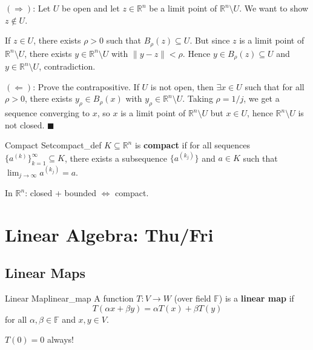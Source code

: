 \documentclass[11pt, letterpaper, openany]{book}
\renewenvironment{proof}[1][\proofname]{%
  \tcolorbox[blanker, breakable, left=1em,
    before skip=1em, after skip=1em,
    borderline west={2pt}{0pt}{MagicTeal!50},
    colback=MagicCream,
    before upper={\textcolor{MagicTeal}{\sffamily\bfseries #1.}\space}
  ]%
}{%
  \hfill\textcolor{MagicTeal}{\ensuremath{\blacksquare}}\endtcolorbox%
}
\begin{document}
\begin{proof}
$(\Rightarrow)$: Let $U$ be open and let $z \in \mathbb{R}^n$ be a limit point of $\mathbb{R}^n \setminus U$. We want to show $z \notin U$.

If $z \in U$, there exists $\rho > 0$ such that $B_\rho(z) \subseteq U$. But since $z$ is a limit point of $\mathbb{R}^n \setminus U$, there exists $y \in \mathbb{R}^n \setminus U$ with $\|y - z\| < \rho$. Hence $y \in B_\rho(z) \subseteq U$ and $y \in \mathbb{R}^n \setminus U$, contradiction.

$(\Leftarrow)$: Prove the contrapositive. If $U$ is not open, then $\exists x \in U$ such that for all $\rho > 0$, there exists $y_\rho \in B_\rho(x)$ with $y_\rho \in \mathbb{R}^n \setminus U$. Taking $\rho = 1/j$, we get a sequence converging to $x$, so $x$ is a limit point of $\mathbb{R}^n \setminus U$ but $x \in U$, hence $\mathbb{R}^n \setminus U$ is not closed.
\end{proof}

\begin{defn}{Compact Set}{compact_def}
$K \subseteq \mathbb{R}^n$ is \textbf{compact} if for all sequences $\{a^{(k)}\}_{k=1}^\infty \subseteq K$, there exists a subsequence $\{a^{(k_j)}\}$ and $a \in K$ such that $\lim_{j\to\infty} a^{(k_j)} = a$.
\end{defn}

\begin{remark}
In $\mathbb{R}^n$: closed + bounded $\Leftrightarrow$ compact.
\end{remark}

\section{Linear Algebra: Thu/Fri}

\subsection{Linear Maps}

\begin{defn}{Linear Map}{linear_map}
A function $T: V \to W$ (over field $\mathbb{F}$) is a \textbf{linear map} if
\[T(\alpha x + \beta y) = \alpha T(x) + \beta T(y)\]
for all $\alpha, \beta \in \mathbb{F}$ and $x, y \in V$.
\end{defn}

\begin{remark}
$T(0) = 0$ always!
\end{remark}
\end{document}
